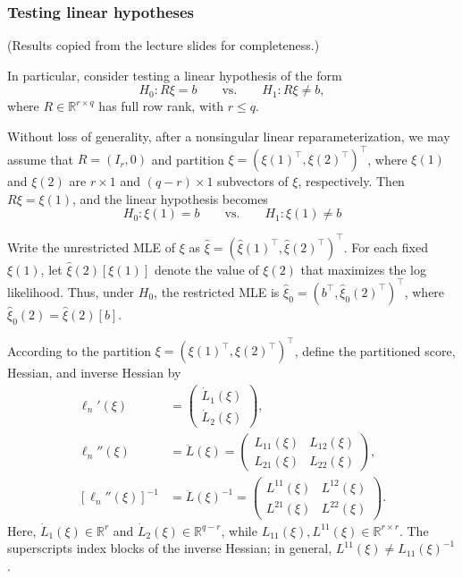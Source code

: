 \documentclass{article}
\theoremstyle{break}
\newcommand{\R}{\ensuremath{\mathbb{R}}}
\begin{document}
\subsubsection{Testing linear hypotheses}
(Results copied from the lecture slides for completeness.)

In particular, consider testing a linear hypothesis of the form
\[
    H_0: R\xi=b
    \qquad \text{vs.} \qquad
    H_1: R\xi\neq b,
\]
where $R \in \R^{r \times q}$ has full row rank, with $r \leq q$.

Without loss of generality, after a nonsingular linear reparameterization, we may assume that $R = (I_r,0)$ and partition $\xi = \left(\xi(1)^\top,\xi(2)^\top\right)^\top$, where $\xi(1)$ and $\xi(2)$ are $r \times 1$ and $(q-r) \times 1$ subvectors of $\xi$, respectively. Then $R\xi=\xi(1)$, and the linear hypothesis becomes
%
\begin{equation*}
  H_0: \xi(1) = b
  \qquad \text{vs.} \qquad
  H_1: \xi(1) \ne b
\end{equation*}
%

Write the unrestricted MLE of $\xi$ as $\hat{\xi} = (\hat{\xi}(1)^\top,\hat{\xi}(2)^\top)^\top$. For each fixed $\xi(1)$, let $\hat{\xi}(2)[\xi(1)]$ denote the value of $\xi(2)$ that maximizes the log likelihood. Thus, under $H_0$, the restricted MLE is $\hat{\xi}_0 = (b^\top,\hat{\xi}_0(2)^\top)^\top$, where $\hat{\xi}_0(2)=\hat{\xi}(2)[b]$.

According to the partition $\xi = \left(\xi(1)^\top,\xi(2)^\top\right)^\top$, define the partitioned score, Hessian, and inverse Hessian by
\begin{align*}
  \ell_n'(\xi)
  &= \begin{pmatrix}
    \dot{L}_1(\xi) \\
    \dot{L}_2(\xi)
  \end{pmatrix}, \\
  \ell_n''(\xi)
  &= \ddot{L}(\xi)
  = \begin{pmatrix}
    L_{11}(\xi) & L_{12}(\xi) \\
    L_{21}(\xi) & L_{22}(\xi)
  \end{pmatrix}, \\
  [\ell_n''(\xi)]^{-1}
  &= \ddot{L}(\xi)^{-1}
  = \begin{pmatrix}
    L^{11}(\xi) & L^{12}(\xi) \\
    L^{21}(\xi) & L^{22}(\xi)
  \end{pmatrix}.
\end{align*}
Here, $\dot{L}_1(\xi) \in \R^r$ and $\dot{L}_2(\xi) \in \R^{q-r}$, while $L_{11}(\xi), L^{11}(\xi) \in \R^{r \times r}$. The superscripts index blocks of the inverse Hessian; in general, $L^{11}(\xi) \ne L_{11}(\xi)^{-1}$.
\end{document}
